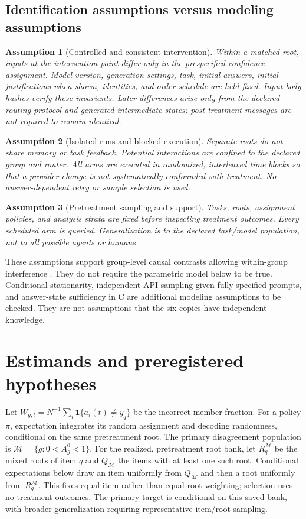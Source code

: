 \documentclass[11pt]{article}
\newtheorem{assumption}{Assumption}
\newcommand{\ind}{\mathbf 1}
\begin{document}
\subsection{Identification assumptions versus modeling assumptions}
\begin{assumption}[Controlled and consistent intervention]
Within a matched root, inputs at the intervention point differ only in the prespecified confidence assignment. Model version, generation settings, task, initial answers, initial justifications when shown, identities, and order schedule are held fixed. Input-body hashes verify these invariants. Later differences arise only from the declared routing protocol and generated intermediate states; post-treatment messages are not required to remain identical.
\end{assumption}
\begin{assumption}[Isolated runs and blocked execution]
Separate roots do not share memory or task feedback. Potential interactions are confined to the declared group and router. All arms are executed in randomized, interleaved time blocks so that a provider change is not systematically confounded with treatment. No answer-dependent retry or sample selection is used.
\end{assumption}
\begin{assumption}[Pretreatment sampling and support]
Tasks, roots, assignment policies, and analysis strata are fixed before inspecting treatment outcomes. Every scheduled arm is queried. Generalization is to the declared task/model population, not to all possible agents or humans.
\end{assumption}
These assumptions support group-level causal contrasts allowing within-group interference \citep{hudgens2008interference}. They do not require the parametric model below to be true. Conditional stationarity, independent API sampling given fully specified prompts, and answer-state sufficiency in C are additional modeling assumptions to be checked. They are not assumptions that the six copies have independent knowledge.

\section{Estimands and preregistered hypotheses}
\label{sec:estimands}
Let $W_{g,t}=N^{-1}\sum_i\ind\{a_i(t)\ne y_q\}$ be the incorrect-member fraction. For a policy $\pi$, expectation integrates its random assignment and decoding randomness, conditional on the same pretreatment root. The primary disagreement population is $\mathcal M=\{g:0<A_g^0<1\}$. For the realized, pretreatment root bank, let $R_q^{\mathcal M}$ be the mixed roots of item $q$ and $Q_{\mathcal M}$ the items with at least one such root. Conditional expectations below draw an item uniformly from $Q_{\mathcal M}$ and then a root uniformly from $R_q^{\mathcal M}$. This fixes equal-item rather than equal-root weighting; selection uses no treatment outcomes. The primary target is conditional on this saved bank, with broader generalization requiring representative item/root sampling.
\end{document}
